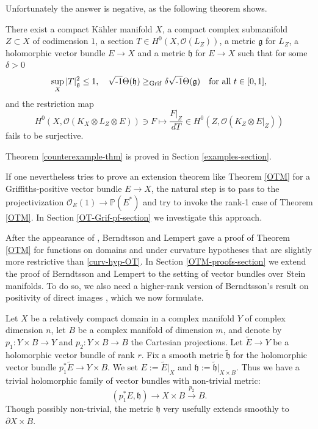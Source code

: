 \documentclass[12pt,hidelinks]{amsart}
\newcommand{\noi}{\noindent}
\newcommand{\cO}{{\mathcal O}}
\newcommand{\fg}{{\mathfrak g}}
\newcommand{\fh}{{\mathfrak h}}
\newcommand{\bbP}{{\mathbb P}}
\newcommand{\di}{\partial}
\newcommand{\ii}{\sqrt{\text{\rm -}1}}
\newcommand{\tensor}{\otimes}
\begin{document}
Unfortunately the answer is negative, as the following theorem shows.

\begin{m-thm}\label{counterexample-thm}
There exist a compact K\"ahler manifold $X$, a compact complex submanifold $Z \subset X$ of codimension $1$, a section $T \in H^0(X, \cO (L_Z))$, a metric $\fg$ for $L_Z$, a holomorphic vector bundle $E \to X$ and a metric $\fh$ for $E \to X$ such that for some $\delta > 0$
\[
\sup _X |T|^2_{\fg}\le 1, \quad  \ii \Theta (\fh)  \ge_{\rm Grif} \delta \ii \Theta (\fg) \quad \text{for all }t \in [0,1],
\]
and the restriction map 
\[
H^0(X, \cO (K_X \tensor L_Z \tensor E)) \ni F \mapsto \frac{F|_Z}{dT}\in  H^0(Z, \cO (K_Z \tensor E|_Z))
\]
fails to be surjective. 
\end{m-thm}

\noi Theorem \ref{counterexample-thm} is proved in Section \ref{examples-section}.

If one nevertheless tries to prove an extension theorem like Theorem \ref{OTM} for a Griffiths-positive vector bundle $E \to X$, the natural step is to pass to the projectivization $\cO _E (1) \to \bbP(E^*)$ and try to invoke the rank-1 case of Theorem \ref{OTM}.  In Section \ref{OT-Grif-pf-section} we investigate this approach.

After the appearance of \cite{gz}, Berndtsson and Lempert gave a proof of Theorem \ref{OTM} for functions on domains and under curvature hypotheses that are slightly more restrictive than \eqref{curv-hyp-OT}.  In Section \ref{OTM-proofs-section} we extend the proof of Berndtsson and Lempert to the setting of vector bundles over Stein manifolds.  To do so, we also need a higher-rank version of Berndtsson's result on positivity of direct images \cite[Theorem 1.1]{bo-annals}, which we now formulate.  

Let $X$ be a relatively compact domain in a complex manifold $Y$ of complex dimension $n$, let $B$ be a complex manifold of dimension $m$, and denote by $p_1 :Y \times B \to Y$ and $p_2 :Y \times B \to B$ the Cartesian projections. Let $\tilde E \to Y$ be a holomorphic vector bundle of rank $r$.  Fix a smooth metric $\tilde \fh$ for the holomorphic vector bundle $p_1^* \tilde E \to Y \times B$.  We set $E := \tilde E|_X$ and $\fh := \tilde \fh |_{X \times B}$.  Thus we have a trivial holomorphic family of vector bundles with non-trivial metric:
\[
(p_1^*E , \fh) \to X\times B \stackrel{p_2}{\to} B.
\]
Though possibly non-trivial, the metric $\fh$ very usefully extends smoothly to $\di X \times B$.
\end{document}
